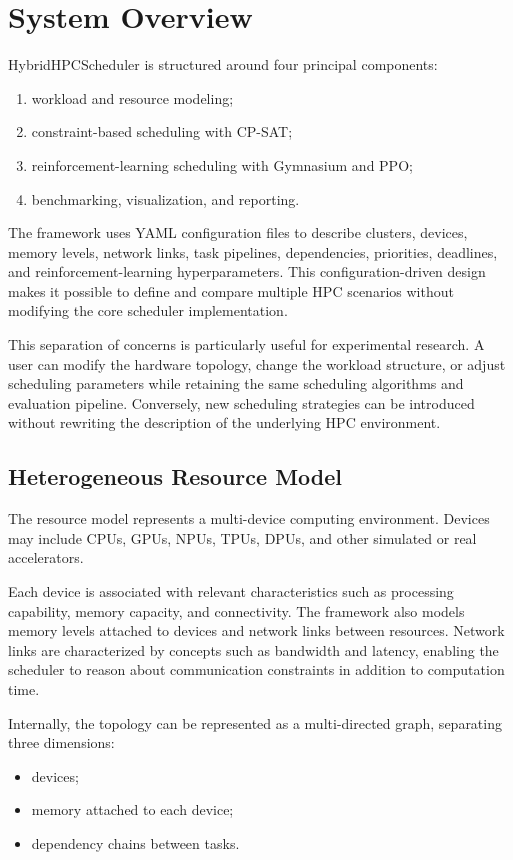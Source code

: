 \documentclass[conference]{IEEEtran}
\begin{document}
\section{System Overview}
HybridHPCScheduler is structured around four principal components:
\begin{enumerate}
    \item workload and resource modeling;
    \item constraint-based scheduling with CP-SAT;
    \item reinforcement-learning scheduling with Gymnasium and PPO;
    \item benchmarking, visualization, and reporting.
\end{enumerate}

The framework uses YAML configuration files to describe clusters, devices,
memory levels, network links, task pipelines, dependencies, priorities,
deadlines, and reinforcement-learning hyperparameters. This configuration-driven
design makes it possible to define and compare multiple HPC scenarios without
modifying the core scheduler implementation.

This separation of concerns is particularly useful for experimental research.
A user can modify the hardware topology, change the workload structure, or
adjust scheduling parameters while retaining the same scheduling algorithms and
evaluation pipeline. Conversely, new scheduling strategies can be introduced
without rewriting the description of the underlying HPC environment.

\subsection{Heterogeneous Resource Model}
The resource model represents a multi-device computing environment. Devices may
include CPUs, GPUs, NPUs, TPUs, DPUs, and other simulated or real accelerators.

Each device is associated with relevant characteristics such as processing
capability, memory capacity, and connectivity. The framework also models memory
levels attached to devices and network links between resources. Network links
are characterized by concepts such as bandwidth and latency, enabling the
scheduler to reason about communication constraints in addition to computation
time.

Internally, the topology can be represented as a multi-directed graph,
separating three dimensions:
\begin{itemize}
    \item devices;
    \item memory attached to each device;
    \item dependency chains between tasks.
\end{itemize}
\end{document}
